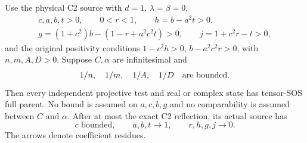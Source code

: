 \begin{theorem}
Use the physical C2 source with $d=1$, $\lambda=\beta=0$,
\begin{gather*}
 c,a,b,t>0,\qquad 0<r<1,\qquad h=b-a^2t>0,\\
 g=(1+c^2)b-(1-r+a^2c^2t)>0,\qquad j=1+c^2r-t>0,
\end{gather*}
and the original positivity conditions
$1-c^2h>0$, $b-a^2c^2r>0$, with $n,m,A,D>0$.
Suppose $C,\alpha$ are infinitesimal and
\[
 1/n,\quad1/m,\quad1/A,\quad1/D
 \quad\hbox{are bounded}.
\]
Then every independent projective test and real or complex state has
 tensor-SOS full parent. No bound is assumed on $a,c,b,g$ and no
comparability is assumed between $C$ and $\alpha$.
After at most the exact C2 reflection, its actual source has
\[
 c\text{ bounded},\qquad a,b,t\longrightarrow1,
 \qquad r,h,g,j\longrightarrow0.
\]
The arrows denote coefficient residues.
\end{theorem}
